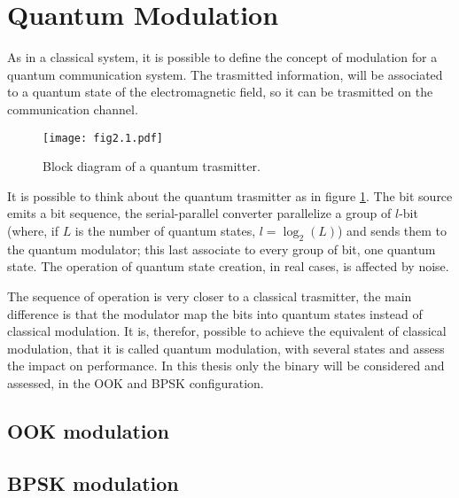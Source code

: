 \section{Quantum Modulation}
    As in a classical system, it is possible to define the concept of modulation for a 
    quantum communication system. The trasmitted information, will be associated to a 
    quantum state of the electromagnetic field, so it can be trasmitted on the communication 
    channel.

    \begin{figure}[ht]
        \texttt{[image: fig2.1.pdf]}
        \caption{Block diagram of a quantum trasmitter.}
        \label{fig:2.1}
    \end{figure}
    It is possible to think about the quantum trasmitter as in figure \ref{fig:2.1}. The bit source
    emits a bit sequence, the serial-parallel converter parallelize a group of $l$-bit (where, if $L$
    is the number of quantum states, $l=\log_2(L)$) and sends them to the quantum modulator; this last
    associate to every group of bit, one quantum state. The operation of quantum state creation, 
    in real cases, is affected by noise.

    The sequence of operation is very closer to a classical trasmitter, the main difference is that
    the modulator map the bits into quantum states instead of classical modulation. It is, therefor, 
    possible to achieve the equivalent of classical modulation, that it is called quantum modulation,
    with several states and assess the impact on performance.
    In this thesis only the binary will be considered and assessed, in the OOK and BPSK configuration.
    
    \subsection{OOK modulation}

    \subsection{BPSK modulation}
